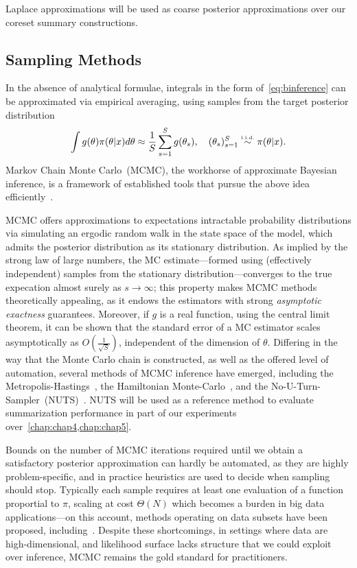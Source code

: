 Laplace approximations will be used as coarse posterior approximations over our coreset summary constructions.

\subsection{Sampling Methods}
\label{subsec:b-sampling-methods}
In the absence of analytical formulae, integrals in the form of~\cref{eq:binference} can be approximated via empirical averaging, using samples from the target posterior distribution
\[
 \int g(\theta) \pi(\theta|x) d\theta \approx \frac{1}{S} \sum_{s=1}^{S} g(\theta_s), \quad (\theta_s)_{s=1}^{S} \distiid \pi(\theta|x) .
\]
Markov Chain Monte Carlo~(MCMC), the workhorse of approximate Bayesian inference, is a framework of established tools that pursue the above idea efficiently~\citep{geyer92, gilks05, robert05}. 

MCMC offers approximations to expectations \wrt intractable probability distributions via simulating an ergodic random walk in the state space of the model, which admits the posterior distribution as its stationary distribution. As implied by the strong law of large numbers, the MC estimate---formed using (effectively independent) samples from the stationary distribution---converges to the true expecation almost surely as $s \rightarrow \infty$; this property makes MCMC methods theoretically appealing, as it endows the estimators with strong \emph{asymptotic exactness} guarantees. Moreover, if $g$ is a real function, using the central limit theorem, it can be shown that the standard error of a MC estimator scales asymptotically as $O(\frac{1}{\sqrt{S}})$, independent of the dimension of $\theta$. Differing in the way that the Monte Carlo chain is constructed, as well as the offered level of automation, several methods of MCMC inference have emerged, including the Metropolis-Hastings~\citep{andrieu03}, the Hamiltonian Monte-Carlo~\citep{neal11}, and the No-U-Turn-Sampler~(NUTS)~\citep{hoffman14}. NUTS will be used as a reference method to evaluate summarization performance in part of our experiments over~\cref{chap:chap4,chap:chap5}.

Bounds on the number of MCMC iterations required until we obtain a satisfactory posterior approximation can hardly be automated, as they are highly problem-specific, and in practice heuristics are used to decide when sampling should stop. Typically each sample requires at least one evaluation of a function proportial to $\pi$, scaling at cost $\Theta(N)$ which becomes a burden in big data applications---on this account, methods operating on data subsets have been proposed, including~\citep{welling11,korattikara14,bardenet14}. Despite these shortcomings, in settings where data are high-dimensional, and likelihood surface lacks structure that we could exploit over inference, MCMC remains the gold standard for practitioners.



